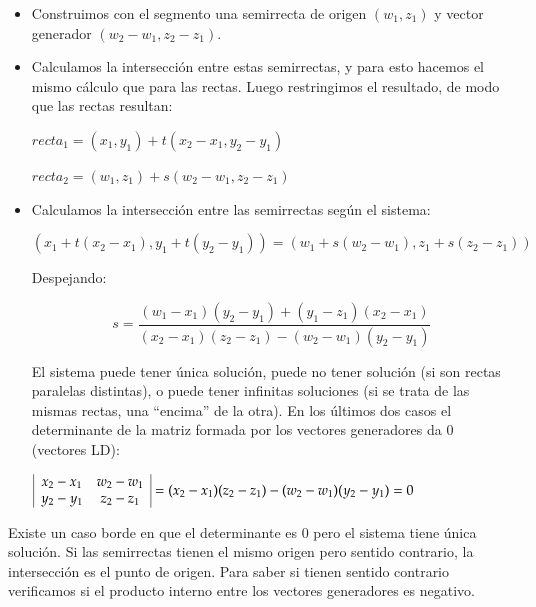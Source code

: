\begin{itemize}
\item Construimos con el segmento una semirrecta de origen $(w_1,z_1)$ y vector generador
$(w_2-w_1, z_2-z_1)$.

\item Calculamos la intersección entre estas semirrectas, y para esto hacemos el mismo cálculo que
para las rectas. Luego restringimos el resultado, de modo que las rectas resultan:

\vspace{0.2cm}
$recta_1 = (x_1, y_1) + t(x_2 - x_1, y_2 - y_1)$

\vspace{0.1cm}
$recta_2 = (w_1, z_1) + s(w_2 - w_1, z_2 - z_1)$
\vspace{0.2cm}

\item Calculamos la intersección entre las semirrectas según el sistema:

$$(x_1 + t(x_2 - x_1), y_1 + t(y_2 - y_1)) = (w_1 + s(w_2 - w_1), z_1 + s(z_2 - z_1))$$

Despejando:

$$s = \displaystyle\frac{(w_1 - x_1)(y_2 - y_1) + (y_1 - z_1)(x_2 - x_1)}
                       {(x_2 - x_1)(z_2 - z_1) - (w_2 - w_1)(y_2 - y_1)}$$

El sistema puede tener única solución, puede no tener solución (si son
rectas paralelas distintas), o puede tener infinitas soluciones (si se
trata de las mismas rectas, una ``encima'' de la otra). En los últimos dos
casos el determinante de la matriz formada por los vectores generadores da 0
(vectores LD):

\vspace{0.2cm}
\begin{center}
$\vline
\begin{array}{cc}
x_2 - x_1 & w_2 - w_1 \\
y_2 - y_1 & z_2 - z_1 \\
\end{array}\vline
= (x_2 - x_1)(z_2 - z_1) - (w_2 - w_1)(y_2 - y_1) = 0$
\end{center}
\vspace{0.2cm}

\end{itemize}

Existe un caso borde en que el determinante es $0$ pero el sistema tiene única
solución. Si las semirrectas tienen el mismo origen pero sentido contrario,
la intersección es el punto de origen. Para saber si tienen sentido contrario
verificamos si el producto interno entre los vectores generadores es negativo.

